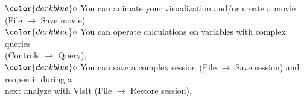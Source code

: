 \documentclass[10pt]{beamer}
\begin{document}
\begin{frame}
\begin{block}{}
\hspace{1cm} $\color{darkblue}\circ$ {\small{You can animate your visualization and/or create a movie (File $\rightarrow$ Save movie)}}\\

\hspace{1cm} $\color{darkblue}\circ$ {\small{You can operate calculations on variables with complex queries \\
\hspace{1.3cm} (Controls $\rightarrow$ Query),}}\\

\hspace{1cm} $\color{darkblue}\circ$ {\small{You can save a complex session (File $\rightarrow$ Save session) and reopen it during a \\
\hspace{1.3cm} next analyze with VisIt (File $\rightarrow$ Restore session),}}



\end{block}
\end{frame}
\end{document}

